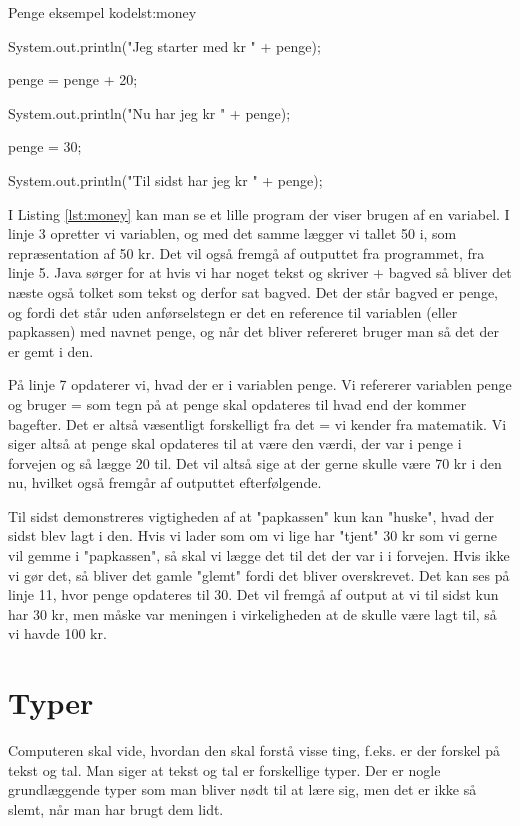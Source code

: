 {\begin{JavaCode}{Penge eksempel kode}{lst:money}
{{		System.out.println("Jeg starter med kr " + penge);
		
		penge = penge + 20;
		
		System.out.println("Nu har jeg kr " + penge);
		
		penge = 30;
		
		System.out.println("Til sidst har jeg kr " + penge);
	}
}
\end{JavaCode}

I Listing \ref{lst:money} kan man se et lille program der viser brugen af en variabel. I linje 3 opretter vi variablen, og med det samme lægger vi tallet 50 i, som repræsentation af 50 kr. Det vil også fremgå af outputtet fra programmet, fra linje 5. Java sørger for at hvis vi har noget tekst og skriver + bagved så bliver det næste også tolket som tekst og derfor sat bagved. Det der står bagved er penge, og fordi det står uden anførselstegn er det en reference til variablen (eller papkassen) med navnet penge, og når det bliver refereret bruger man så det der er gemt i den.

På linje 7 opdaterer vi, hvad der er i variablen penge. Vi refererer variablen penge og bruger = som tegn på at penge skal opdateres til hvad end der kommer bagefter. Det er altså væsentligt forskelligt fra det = vi kender fra matematik. Vi siger altså at penge skal opdateres til at være den værdi, der var i penge i forvejen og så lægge 20 til. Det vil altså sige at der gerne skulle være 70 kr i den nu, hvilket også fremgår af outputtet efterfølgende.

Til sidst demonstreres vigtigheden af at "papkassen" kun kan "huske", hvad der sidst blev lagt i den. Hvis vi lader som om vi lige har "tjent" 30 kr som vi gerne vil gemme i "papkassen", så skal vi lægge det til det der var i i forvejen. Hvis ikke vi gør det, så bliver det gamle "glemt" fordi det bliver overskrevet. Det kan ses på linje 11, hvor penge opdateres til 30. Det vil fremgå af output at vi til sidst kun har 30 kr, men måske var meningen i virkeligheden at de skulle være lagt til, så vi havde 100 kr.

\section{Typer}
Computeren skal vide, hvordan den skal forstå visse ting, f.eks. er der forskel på tekst og tal. Man siger at tekst og tal er forskellige typer. Der er nogle grundlæggende typer som man bliver nødt til at lære sig, men det er ikke så slemt, når man har brugt dem lidt.

}
